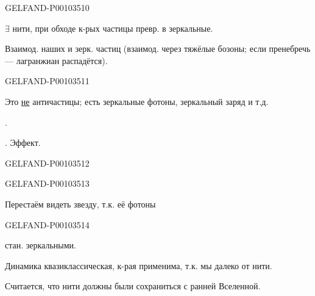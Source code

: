 \begin{GelfandAdjacentEvidence}{GELFAND-P001035}{10}

$\exists$ нити, при обходе к-рых частицы превр. в зеркальные.

Взаимод. наших и зерк. частиц  (взаимод. через тяжёлые бозоны; если пренебречь --- лагранжиан распадётся).
\end{GelfandAdjacentEvidence}
\begin{GelfandAdjacentEvidence}{GELFAND-P001035}{11}


Это \underline{не} античастицы; есть зеркальные фотоны, зеркальный заряд и т.д.

.

. Эффект.
\end{GelfandAdjacentEvidence}
\begin{GelfandAdjacentEvidence}{GELFAND-P001035}{12}


\end{GelfandAdjacentEvidence}
\begin{GelfandAdjacentEvidence}{GELFAND-P001035}{13}

Перестаём видеть звезду, т.к. её фотоны
\end{GelfandAdjacentEvidence}
\begin{GelfandAdjacentEvidence}{GELFAND-P001035}{14}

стан. зеркальными.

Динамика квазиклассическая, к-рая применима, т.к. мы далеко от нити.

Считается, что нити должны были сохраниться с ранней Вселенной.
\end{GelfandAdjacentEvidence}



